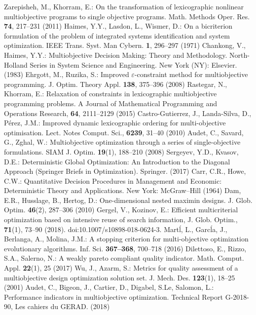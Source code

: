 \documentclass[smallextended]{svjour3}       %
\begin{document}
\begin{thebibliography}{}
 Zarepisheh, M., Khorram, E.: On the transformation of lexicographic nonlinear multiobjective  programs to single objective programs. Math. Methods Oper. Res. \textbf{74}, 217--231 (2011)
 Haimes, Y.Y., Lasdon, L., Wismer, D.: On a bicriterion formulation of the problem of integrated systems identification and system optimization. IEEE Trans. Syst. Man Cybern. \textbf{1}, 296--297 (1971)
 Chankong, V., Haimes, Y.Y.: Multiobjective Decision Making: Theory and Methodology. North-Holland Series in System Science and Engineering. New York (NY): Elsevier. (1983)
 Ehrgott, M., Ruzika, S.: Improved $\varepsilon$-constraint method for multiobjective programming. J. Optim. Theory Appl. \textbf{138}, 375--396 (2008)
 Rastegar, N., Khorram, E.: Relaxation of constraints in lexicographic multiobjective programming problems. A Journal of Mathematical Programming and Operations Research, \textbf{64}, 2111--2129 (2015)
 Castro-Gutierrez, J., Landa-Silva, D., P\'erez, J.M.: Improved dynamic lexicographic ordering for multi-objective optimisation. Lect. Notes Comput. Sci., \textbf{6239}, 31--40 (2010) 
 Audet, C., Savard, G., Zghal, W.: Multiobjective optimization through a series of single-objective formulations. SIAM J. Optim. \textbf{19}(1), 188--210 (2008)
 Sergeyev, Y.D., Kvasov, D.E.: Deterministic Global Optimization: An Introduction to the Diagonal Approach (Springer Briefs in Optimization). Springer. (2017)
 Carr, C.R., Howe, C.W.: Quantitative Decision Procedures in Management and Economic: Deterministic Theory and Applications. New York: McGraw–Hill (1964)
 Dam, E.R., Husslage, B., Hertog, D.: One-dimensional nested maximin designs. J. Glob. Optim. \textbf{46}(2), 287--306 (2010)
 Gergel, V., Kozinov, E.: Efficient multicriterial optimization based on intensive reuse of search information, J. Glob. Optim., \textbf{71}(1), 73--90 (2018). doi:10.1007/s10898-018-0624-3.
 Mart\'l, L., Garc\'la, J., Berlanga, A., Molina, J.M.: A stopping criterion for multi-objective optimization evolutionary algorithms. Inf. Sci. \textbf{367--368}, 700--718 (2016)
 Dilettoso, E., Rizzo, S.A., Salerno, N.: A weakly pareto compliant quality indicator. Math. Comput. Appl. \textbf{22}(1), 25 (2017)
 Wu, J., Azarm, S.: Metrics for quality assessment of a multiobjective design optimization solution set. J. Mech. Des. \textbf{123}(1), 18--25 (2001)
 Audet, C., Bigeon, J., Cartier, D., Digabel, S.Le, Salomon, L.: Performance indicators in multiobjective optimization. Technical Report G-2018-90, Les cahiers du GERAD. (2018)

\end{thebibliography}
\end{document}
